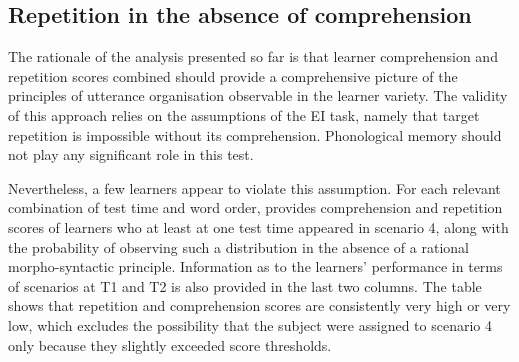 \subsection{Repetition in the absence of comprehension}\label{sec:06:4.1}

The rationale of the analysis presented so far is that learner comprehension and repetition scores combined should provide a comprehensive picture of the principles of utterance organisation observable in the learner variety. The validity of this approach relies on the assumptions of the EI task, namely that target repetition is impossible without its comprehension. Phonological memory should not play any significant role in this test. 

Nevertheless, a few learners appear to violate this assumption. For each relevant combination of test time and word order,  provides comprehension and repetition scores of learners who at least at one test time appeared in scenario 4, along with the probability of observing such a distribution in the absence of a rational morpho-syntactic principle. Information as to the learners' performance in terms of scenarios at T1 and T2 is also provided in the last two columns. The table shows that repetition and comprehension scores are consistently very high or very low, which excludes the possibility that the subject were assigned to scenario 4 only because they slightly exceeded score thresholds. 

